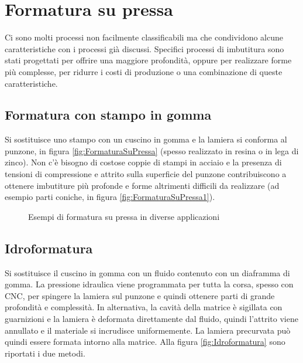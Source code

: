 \section{Formatura su pressa}
Ci sono molti processi non facilmente classificabili ma che condividono alcune caratteristiche con i processi già discussi.
Specifici processi di imbutitura sono stati progettati per offrire una maggiore profondità, oppure per realizzare forme più complesse, per ridurre i costi di produzione o una combinazione di queste caratteristiche.

\subsection{Formatura con stampo in gomma}
Si sostituisce uno stampo con un cuscino in gomma e la lamiera si conforma al punzone, in figura \ref{fig:FormaturaSuPressa} (spesso realizzato in resina o in lega di zinco). Non c'è bisogno di costose coppie di stampi in acciaio e la presenza di tensioni di compressione e attrito sulla superficie del punzone contribuiscono a ottenere imbutiture più profonde e forme altrimenti difficili da realizzare (ad esempio parti coniche, in figura \ref{fig:FormaturaSuPressa1}).

\begin{figure}
\centering
{}\quad
{}
\caption{Esempi di formatura su pressa in diverse applicazioni}
\label{fig:FormSuPressa}
\end{figure}

\subsection{Idroformatura}
Si sostituisce il cuscino in gomma con un fluido contenuto con un diaframma di gomma. La pressione idraulica viene programmata per tutta la corsa, spesso con \ac{CNC}, per spingere la lamiera sul punzone e quindi ottenere parti di grande profondità e complessità.
In alternativa, la cavità della matrice è sigillata con guarnizioni e la lamiera è deformata direttamente dal fluido, quindi l'attrito viene annullato e il materiale si incrudisce uniformemente. La lamiera precurvata può quindi essere formata intorno alla matrice.
Alla figura \ref{fig:Idroformatura} sono riportati i due metodi.

